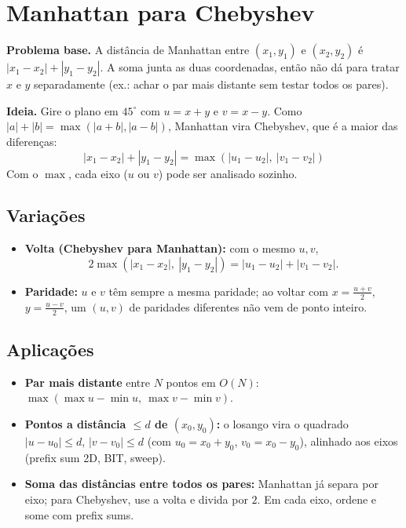 \section{Manhattan para Chebyshev}

\textbf{Problema base.} A distância de Manhattan entre $(x_1, y_1)$ e $(x_2, y_2)$ é $|x_1 - x_2| + |y_1 - y_2|$. A soma
junta as duas coordenadas, então não dá para tratar $x$ e $y$ separadamente (ex.: achar o par mais distante sem testar
todos os pares).

\textbf{Ideia.} Gire o plano em $45^\circ$ com $u = x + y$ e $v = x - y$. Como $|a| + |b| = \max(|a + b|, |a - b|)$,
Manhattan vira Chebyshev, que é a maior das diferenças:
\[
\boxed{|x_1 - x_2| + |y_1 - y_2| = \max(|u_1 - u_2|,\ |v_1 - v_2|)}
\]
Com o $\max$, cada eixo ($u$ ou $v$) pode ser analisado sozinho.

\subsection*{Variações}

\begin{itemize}
  \item \textbf{Volta (Chebyshev para Manhattan):} com o mesmo $u, v$,
        \[ 2 \max(|x_1 - x_2|,\ |y_1 - y_2|) = |u_1 - u_2| + |v_1 - v_2|. \]
  \item \textbf{Paridade:} $u$ e $v$ têm sempre a mesma paridade; ao voltar com $x = \frac{u+v}{2}$, $y = \frac{u-v}{2}$,
        um $(u, v)$ de paridades diferentes não vem de ponto inteiro.
\end{itemize}

\subsection*{Aplicações}

\begin{itemize}
  \item \textbf{Par mais distante} entre $N$ pontos em $O(N)$: $\max(\max u - \min u,\ \max v - \min v)$.
  \item \textbf{Pontos a distância $\le d$ de $(x_0, y_0)$:} o losango vira o quadrado $|u - u_0| \le d$, $|v - v_0| \le d$
        (com $u_0 = x_0 + y_0$, $v_0 = x_0 - y_0$), alinhado aos eixos (prefix sum 2D, BIT, sweep).
  \item \textbf{Soma das distâncias entre todos os pares:} Manhattan já separa por eixo; para Chebyshev, use a volta e
        divida por $2$. Em cada eixo, ordene e some com prefix sums.
\end{itemize}

